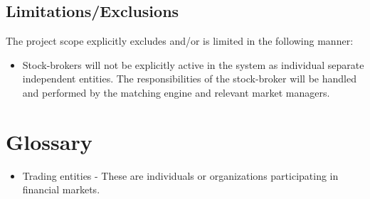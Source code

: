 \documentclass[12pt]{article}
\begin{document}
		\subsection{Limitations/Exclusions}
		The project scope explicitly excludes and/or is limited in the following manner:
		\begin{itemize}
		\item Stock-brokers will not be explicitly active in the system as individual separate independent entities. The responsibilities of the stock-broker will be handled and performed by the matching engine and relevant market managers.
		\end{itemize}
	
		
	\newpage				    
	\section{Glossary}
	\begin{itemize}
	\item Trading entities - These are individuals or organizations participating in financial markets.
	\end{itemize}					    			    			    		
\end{document}
